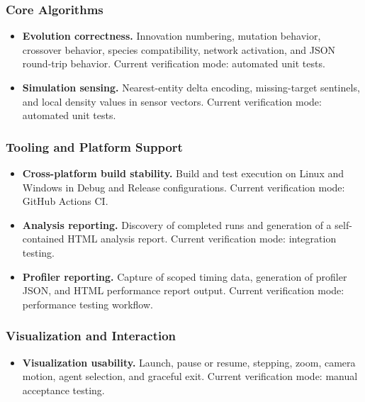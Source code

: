 \subsubsection{Core Algorithms}

\begin{itemize}[leftmargin=*]
	\item \textbf{Evolution correctness.} Innovation numbering, mutation behavior,
	      crossover behavior, species compatibility, network activation, and JSON round-trip
	      behavior. Current verification mode: automated unit tests.

	\item \textbf{Simulation sensing.} Nearest-entity delta encoding, missing-target
	      sentinels, and local density values in sensor vectors. Current verification mode:
	      automated unit tests.
\end{itemize}

\subsubsection{Tooling and Platform Support}

\begin{itemize}[leftmargin=*]
	\item \textbf{Cross-platform build stability.} Build and test execution on Linux and
	      Windows in Debug and Release configurations. Current verification mode: GitHub Actions CI.

	\item \textbf{Analysis reporting.} Discovery of completed runs and generation of a
	      self-contained HTML analysis report. Current verification mode: integration testing.

	\item \textbf{Profiler reporting.} Capture of scoped timing data, generation of
	      profiler JSON, and HTML performance report output. Current verification mode:
	      performance testing workflow.
\end{itemize}

\subsubsection{Visualization and Interaction}

\begin{itemize}[leftmargin=*]
	\item \textbf{Visualization usability.} Launch, pause or resume, stepping, zoom,
	      camera motion, agent selection, and graceful exit. Current verification mode: manual
	      acceptance testing.
\end{itemize}

